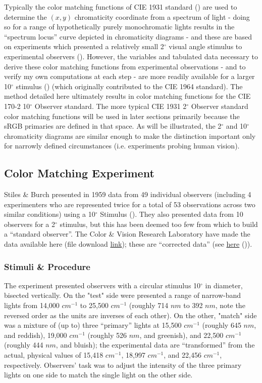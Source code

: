 \documentclass[twocolumn]{article}
\begin{document}
Typically the color matching functions of CIE 1931 standard (\cite{cie1932commission}) are used to determine the $(x,y)$ chromaticity coordinate from a spectrum of light - doing so for a range of hypothetically purely monochromatic lights results in the “spectrum locus” curve depicted in chromaticity diagrams - and these are based on experiments which presented a relatively small 2$^\circ$ visual angle stimulus to experimental observers (\cite{wright1929re,guild1931colorimetric}).  However, the variables and tabulated data necessary to derive these color matching functions from experimental observations - and to verify my own computations at each step - are more readily available for a larger 10$^\circ$ stimulus (\cite{stiles1959npl}) (which originally contributed to the CIE 1964 standard).  The method detailed here ultimately results in color matching functions for the CIE 170-2 10$^\circ$ Observer standard.  The more typical CIE 1931 2$^\circ$ Observer standard color matching functions will be used in later sections primarily because the sRGB primaries are defined in that space.  As will be illustrated, the 2$^\circ$ and 10$^\circ$ chromaticity diagrams are similar enough to make the distinction important only for narrowly defined circumstances (i.e. experiments probing human vision).
\subsection{Color Matching Experiment}
Stiles \& Burch presented in 1959 data from 49 individual observers (including 4 experimenters who are represented twice for a total of 53 observations across two similar conditions) using a 10$^\circ$ Stimulus (\cite{stiles1959npl}).  They also presented data from 10 observers for a 2$^\circ$ stimulus, but this has been deemed too few from which to build a “standard observer”.  The Color \& Vision Research Laboratory have made the data available here (file download \href{http://www.cvrl.org/database/data/sb_individual/SB10_corrected_indiv_CMFs.xls}{link}); these are “corrected data” (see \href{http://www.cvrl.org/database/text/sb_individual/sb10_individual.htm}{here} (\cite{stiles1958average})).
\subsubsection{Stimuli \& Procedure}
The experiment presented observers with a circular stimulus 10$^\circ$ in diameter, bisected vertically.  On the "test" side were presented a range of narrow-band lights from 14,000 $cm^{-1}$ to 25,500 $cm^{-1}$ (roughly 714 $nm$ to 392 $nm$, note the reversed order as the units are inverses of each other).  On the other, "match" side was a mixture of (up to) three “primary” lights at 15,500 $cm^{-1}$ (roughly 645 $nm$, and reddish), 19,000 $cm^{-1}$ (roughly 526 $nm$, and greenish), and 22,500 $cm^{-1}$ (roughly 444 $nm$, and bluish); the experimental data are “transformed” from the actual, physical values of 15,418 $cm^{-1}$, 18,997 $cm^{-1}$, and 22,456 $cm^{-1}$, respectively.  Observers’ task was to adjust the intensity of the three primary lights on one side to match the single light on the other side.
\end{document}

